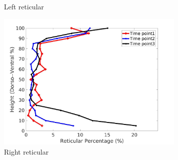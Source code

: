 \begin{figure}[H]
\begin{subfigure}{.42\linewidth}
  \caption{Left reticular}
  \label{fig:IPF15DiseaseDorsoToVentral-c} 
\end{subfigure} 
\begin{subfigure}{.42\linewidth}%
  \includegraphics[width=\linewidth,trim={{.0\wd0} {.0\wd0} {.0\wd0} {.0\wd0}},clip]{Appendix/Image_AppexA/DorsoToVentral/IPF15RightLungReticularDiseaseDorsoToVentral.jpg}
  \caption{Right reticular}
  \label{fig:IPF15DiseaseDorsoToVentral-d}
\end{subfigure}
\begin{subfigure}{.42\linewidth}%

\end{subfigure}
\end{figure}
